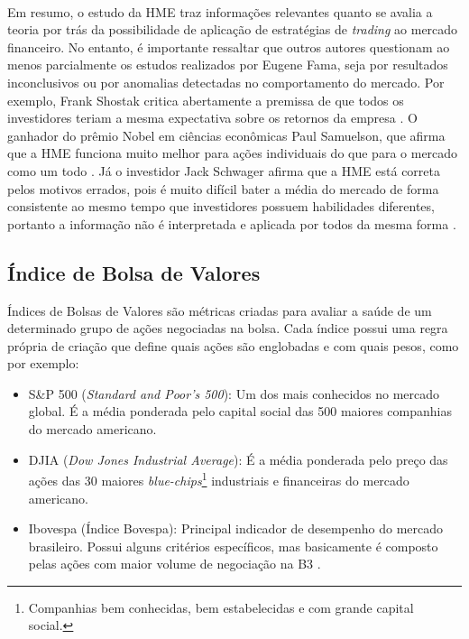 \paragraph{} Em resumo, o estudo da HME traz informações relevantes quanto se avalia a teoria por trás da possibilidade de aplicação de estratégias de \textit{trading} ao mercado financeiro. No entanto, é importante ressaltar que outros autores questionam ao menos parcialmente os estudos realizados por Eugene Fama, seja por resultados inconclusivos ou por anomalias detectadas no comportamento do mercado. Por exemplo, Frank Shostak critica abertamente a premissa de que todos os investidores teriam a mesma expectativa sobre os retornos da empresa \cite{shostak1997defense}. O ganhador do prêmio Nobel em ciências econômicas Paul Samuelson, que afirma que a HME funciona muito melhor para ações individuais do que para o mercado como um todo \cite{jung2005samuelson}. Já o investidor Jack Schwager afirma que a HME está correta pelos motivos errados, pois é muito difícil bater a média do mercado de forma consistente ao mesmo tempo que investidores possuem habilidades diferentes, portanto a informação não é interpretada e aplicada por todos da mesma forma \cite{schwager2012market}.



\FloatBarrier
\subsection{Índice de Bolsa de Valores}
\label{sub:ibov}

Índices de Bolsas de Valores \cite{stock_index} são métricas criadas para avaliar a saúde de um determinado grupo de ações negociadas na bolsa. Cada índice possui uma regra própria de criação que define quais ações são englobadas e com quais pesos, como por exemplo:

\begin{itemize}
    \item S\&P 500 (\textit{Standard and Poor's 500}): Um dos mais conhecidos no mercado global. É a média ponderada pelo capital social das 500 maiores companhias do mercado americano.
    \item DJIA (\textit{Dow Jones Industrial Average}): É a média ponderada pelo preço das ações das 30 maiores \textit{blue-chips}\footnote{Companhias bem conhecidas, bem estabelecidas e com grande capital social.} industriais e financeiras do mercado americano.
    \item Ibovespa (Índice Bovespa): Principal indicador de desempenho do mercado brasileiro. Possui alguns critérios específicos, mas basicamente é composto pelas ações com maior volume de negociação na B3 \cite{ibovespa}.
\end{itemize}

